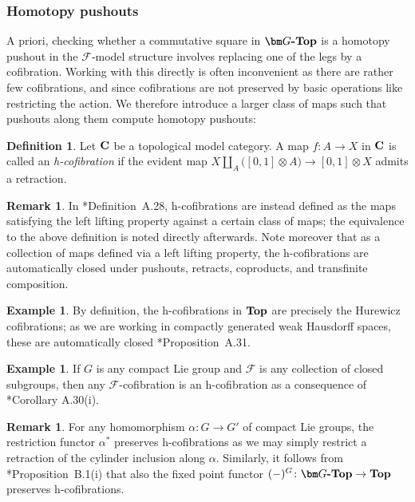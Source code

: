 \documentclass[reqno]{memo-l}
\theoremstyle{mythm}
\theoremstyle{definition}
\newtheorem{rk}[thm]{Remark}
\newtheorem{ex}[thm]{Example}
\newtheorem{definition}[thm]{Definition}
\numberwithin{equation}{section}
\newcommand{\Ff}{{\mathcal{F}}}
\newcommand{\cat}[1]{\textbf{\textup{#1}}}
\begin{document}
\subsubsection{Homotopy pushouts}\label{subsubsec:homotopy-po-equiv}
A priori, checking whether a commutative square in $\cat{$\bm G$-Top}$ is a homotopy pushout in the $\Ff$-model structure involves replacing one of the legs by a cofibration. Working with this directly is often inconvenient as there are rather few cofibrations, and since cofibrations are not preserved by basic operations like restricting the action. We therefore introduce a larger class of maps such that pushouts along them compute homotopy pushouts:

\begin{definition}
    Let $\cat{C}$ be a topological model category. A map $f\colon A\to X$ in $\cat{C}$ is called an \emph{h-cofibration} if the evident map $X\amalg_{A} \bigl([0,1]\otimes A\bigr)\to [0,1]\otimes X$ admits a retraction.
\end{definition}

\begin{rk}\label{rk:h-cof-closure}
    In \cite{schwede2018global}*{Definition~A.28}, h-cofibrations are instead defined as the maps satisfying the left lifting property against a certain class of maps; the equivalence to the above definition is noted directly afterwards. Note moreover that as a collection of maps defined via a left lifting property, the h-cofibrations are automatically closed under pushouts, retracts, coproducts, and transfinite composition.
\end{rk}

\begin{ex}
    By definition, the h-cofibrations in $\cat{Top}$ are precisely the Hurewicz cofibrations; as we are working in compactly generated weak Hausdorff spaces, these are automatically closed \cite{schwede2018global}*{Proposition~A.31}.
\end{ex}

\begin{ex}
    If $G$ is any compact Lie group and $\Ff$ is any collection of closed subgroups, then any $\Ff$-cofibration is an h-cofibration as a consequence of \cite{schwede2018global}*{Corollary A.30(i)}.
\end{ex}

\begin{rk}\label{rk:fixed-and-restr-preserve-h-cof}
    For any homomorphism $\alpha\colon G\to G'$ of compact Lie groups, the restriction functor $\alpha^*$ preserves h-cofibrations as we may simply restrict a retraction of the cylinder inclusion along $\alpha$. Similarly, it follows from \cite{schwede2018global}*{Proposition~B.1(i)} that also the fixed point functor $(-)^G\colon\cat{$\bm G$-Top}\to\cat{Top}$ preserves h-cofibrations.
\end{rk}
\end{document}
